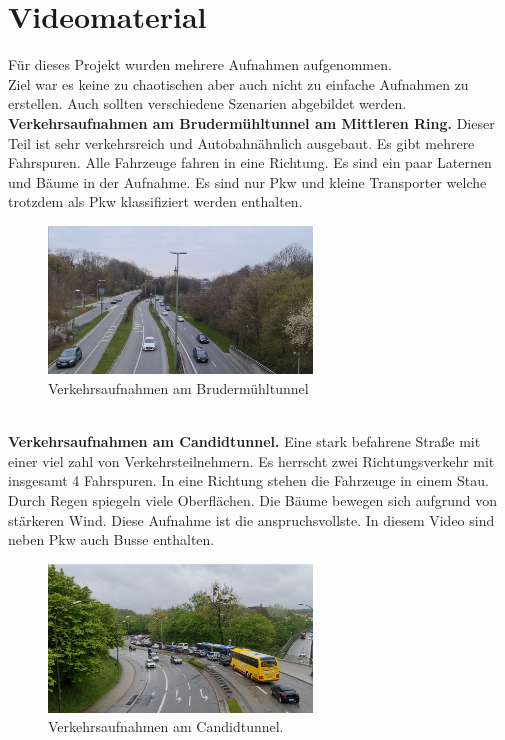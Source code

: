 \documentclass[conference]{IEEEtran}
\begin{document}
	\section{Videomaterial}
	Für dieses Projekt wurden mehrere Aufnahmen aufgenommen.\\ Ziel war es keine zu chaotischen aber auch nicht zu einfache Aufnahmen zu erstellen. Auch sollten verschiedene Szenarien abgebildet werden.\\
	\textbf{Verkehrsaufnahmen am Brudermühltunnel am Mittleren Ring.} Dieser Teil ist sehr verkehrsreich und Autobahnähnlich ausgebaut. Es gibt mehrere Fahrspuren. Alle Fahrzeuge fahren in eine Richtung. Es sind ein paar Laternen und Bäume in der Aufnahme. Es sind nur Pkw und kleine Transporter welche trotzdem als Pkw klassifiziert werden enthalten.
	\begin{figure}[!h]
		\begin{center}
			\includegraphics[width=7cm]{Media/BrudermuhlRaw.png}
			\caption{Verkehrsaufnahmen am Brudermühltunnel}
			\label{BrudermuhlRaw}
		\end{center}
	\end{figure}\\
	\textbf{Verkehrsaufnahmen am Candidtunnel.} Eine stark befahrene Straße mit einer viel zahl von Verkehrsteilnehmern. Es herrscht zwei Richtungsverkehr mit insgesamt 4 Fahrspuren. In eine Richtung stehen die Fahrzeuge in einem Stau. Durch Regen spiegeln viele Oberflächen. Die Bäume bewegen sich aufgrund von stärkeren Wind. Diese Aufnahme ist die anspruchsvollste. In diesem Video sind neben Pkw auch Busse enthalten.
	\begin{figure}[!h]
		\begin{center}
			\includegraphics[width=7cm]{Media/CandidRaw.png}
			\caption{Verkehrsaufnahmen am Candidtunnel.}
			\label{BrudermuhlRaw}
		\end{center}
	\end{figure}\\
\end{document}
